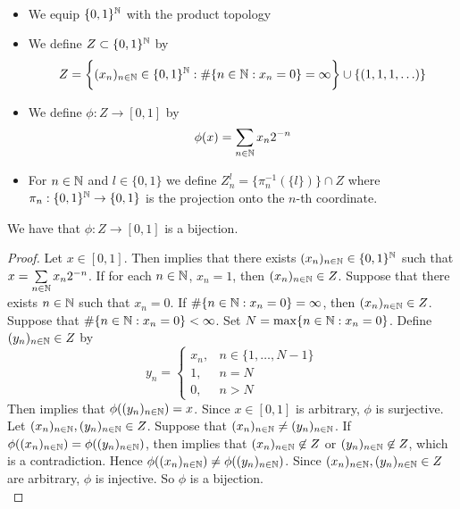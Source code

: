 \documentclass{book}
\begin{document}
	\begin{defn}  \
		\begin{itemize}
			\item We equip $\{0,1\}^{\mathbb{N}}$ with the product topology 
			\item We define $Z \subset \{0,1\}^{\mathbb{N}}$ by 
			$$Z = \bigg \{(x_n)_{n \in \mathbb{N}} \in \{0,1\}^{\mathbb{N}}: \# \{n \in \mathbb{N}: x_n = 0\} = \infty  \bigg \} \cup \{(1, 1, 1, \ldots)\}$$ 
			\item We define $\phi: Z \rightarrow [0,1]$ by 
			$$\phi(x) = \sum\limits_{n \in \mathbb{N}} x_n2^{-n}$$
			\item For $n \in \mathbb{N}$ and $l \in \{0,1\}$ we define $Z_n^l = \{\pi_n^{-1}(\{l\})\} \cap Z$ where $\pi_n: \{0,1 \}^{\mathbb{N}} \rightarrow \{0,1\}$ is the projection onto the $n$-th coordinate.
		\end{itemize}
	\end{defn}
	
	\begin{ex}
		We have that $\phi:Z \rightarrow [0,1]$ is a bijection.
	\end{ex}
	
	\begin{proof}
		Let $x \in [0,1]$. Then  implies that there exists $(x_n)_{n \in \mathbb{N}} \in \{0,1\}^{\mathbb{N}}$ such that $x = \sum\limits_{n \in \mathbb{N}} x_n2^{-n}$. If for each $n \in \mathbb{N}$, $x_n = 1$, then $(x_n)_{n \in \mathbb{N}} \in Z$. Suppose that there exists $n \in \mathbb{N}$ such that $x_n = 0$. If $\# \{n \in \mathbb{N}: x_n = 0\} = \infty$, then $(x_n)_{n \in \mathbb{N}} \in Z$. Suppose that $ \# \{n \in \mathbb{N}: x_n = 0\} < \infty$. Set $N = \max \{ n \in \mathbb{N}: x_n = 0\}$. Define $(y_n)_{n \in \mathbb{N}} \in Z$ by 
		\[
		y_n = 
		\begin{cases}
			x_n, & n \in \{1, \ldots, N-1\} \\
			1, & n = N \\
			0, & n > N
		\end{cases}
		\]
		Then  implies that $\phi((y_n)_{n \in \mathbb{N}}) = x$. Since $x \in [0,1]$ is arbitrary, $\phi$ is surjective. \vspace{.2cm}\\  Let $(x_n)_{n \in \mathbb{N}}, (y_n)_{n \in \mathbb{N}} \in Z$. Suppose that $(x_n)_{n \in \mathbb{N}} \neq (y_n)_{n \in \mathbb{N}}$. If  $\phi((x_n)_{n \in \mathbb{N}}) = \phi((y_n)_{n \in \mathbb{N}})$, then  implies that $(x_n)_{n \in \mathbb{N}} \not \in Z$ or $(y_n)_{n \in \mathbb{N}} \not \in Z$, which is a contradiction. Hence $\phi((x_n)_{n \in \mathbb{N}}) \neq \phi((y_n)_{n \in \mathbb{N}})$. Since $(x_n)_{n \in \mathbb{N}}, (y_n)_{n \in \mathbb{N}} \in Z$ are arbitrary, $\phi$ is injective. So $\phi$ is a bijection. \\
	\end{proof}
	
\end{document}
